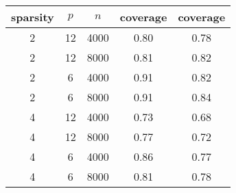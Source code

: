 \begin{table}[ht]
\centering
\begin{tabular}{|ccc|cc|}
  \hline
sparsity & $p$ & $n$ & coverage & coverage \\ 
  \hline
2 & 12 & 4000 & 0.80 & 0.78 \\ 
  2 & 12 & 8000 & 0.81 & 0.82 \\ 
  2 & 6 & 4000 & 0.91 & 0.82 \\ 
  2 & 6 & 8000 & 0.91 & 0.84 \\ 
   \hline
4 & 12 & 4000 & 0.73 & 0.68 \\ 
  4 & 12 & 8000 & 0.77 & 0.72 \\ 
  4 & 6 & 4000 & 0.86 & 0.77 \\ 
  4 & 6 & 8000 & 0.81 & 0.78 \\ 
   \hline
\end{tabular}
\end{table}
